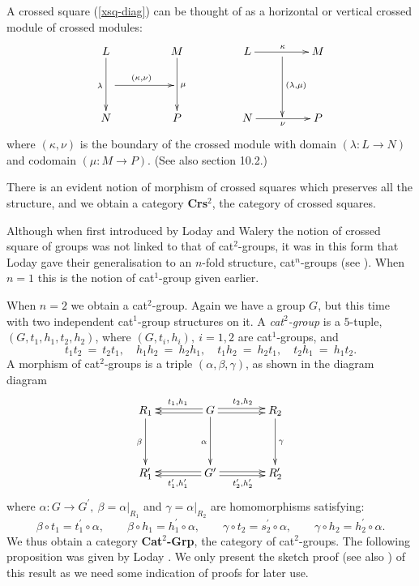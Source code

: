 \documentclass[a4paper,11pt]{article}
\theoremstyle{plain}
\theoremstyle{definition}
\begin{document}
A crossed square (\ref{xsq-diag}) can be thought of as a horizontal or vertical 
crossed module of crossed modules:
\[
\xymatrix@R=20pt@C=20pt
{ L \ar[dd]_{\lambda}  
	&  &  M \ar[dd]^{\mu} 
	      &  &  L \ar[rr]^{\kappa}
	            &  {} \ar[dd]^{(\lambda,\mu)} 
	               &  M \\ 
\quad \ar[rr]^{(\kappa,\nu)} 
    &  &  &  &  &  & \quad \\
  N &  &  P 
	      &  &  N \ar[rr]_{\nu} 
	            &  {} 
	               &  P 
} 
\]
\noindent 
where $(\kappa,\nu)$ is the boundary of the crossed module with 
domain $(\lambda : L \rightarrow N)$ and codomain $(\mu : M \rightarrow P)$. 
(See also \cite{wensley_notes} section 10.2.)

There is an evident notion of morphism of crossed squares  
which preserves all the structure, 
and we obtain a category \textbf{Crs}$^{2}$, the category of crossed squares.

Although when first introduced by Loday and Walery \cite{walery} 
the notion of crossed square of groups was not linked to that of cat$^{2}$-groups, 
it was in this form that Loday gave their generalisation 
to an $n$-fold structure, cat$^{n}$-groups (see \cite{Loday}). 
When $n=1$ this is the notion of cat$^1$-group given earlier.

When $n=2$ we obtain a cat$^{2}$-group. 
Again we have a group $G$, but this time with two independent cat$^{1}$-group 
structures on it. 
A \emph{cat$^{2}$-group} is a $5$-tuple, $(G,t_1,h_1,t_2,h_2)$, 
where $(G,t_{i},h_{i}),~ i=1,2$ are cat$^{1}$-groups, and
\[
t_{1}t_{2} ~=~ t_{2}t_{1}, \quad 
h_{1}h_{2} ~=~ h_{2}h_{1}, \quad 
t_{1}h_{2} ~=~ h_{2}t_{1}, \quad
t_{2}h_{1} ~=~ h_{1}t_{2}. 
\]
A morphism of cat$^{2}$-groups is a triple $(\alpha ,\beta ,\gamma)$,
as shown in the diagram diagram
\[
\xymatrix@R=40pt@C=40pt 
{ R_1 \ar[d]_{\beta} 
	& G \ar[d]_{\alpha} \ar@<-0.4ex>[l]_{t_1,h_1} \ar@<+0.4ex>[l]  
	                    \ar@<+0.5ex>[r]^{t_2,h_2} \ar@<-0.4ex>[r] 
		& R_2 \ar[d]^{\gamma} \\
  R'_1 
	& G' \ar@<+0.4ex>[l]^{t'_1,h'_1} \ar@<-0.4ex>[l] 
	     \ar@<-0.4ex>[r]_{t'_2,h'_2} \ar@<+0.4ex>[r] 
		& R'_2 
}
\]
\noindent where 
$\alpha : G \to G^{\prime},~ \beta = \alpha|_{R_1}$ 
and $\gamma = \alpha|_{R_2}$ are homomorphisms satisfying: 
$$	
\beta \circ t_1 = t_1^{\prime} \circ \alpha, \qquad 
\beta \circ h_1 = h_1^{\prime} \circ \alpha, \qquad 
\gamma \circ t_2 = s_2^{\prime} \circ \alpha, \qquad 
\gamma \circ h_2 = h_2^{\prime} \circ \alpha. 
$$
We thus obtain a category \textbf{Cat}$^{2}$\textbf{-Grp}, 
the category of cat$^{2}$-groups. 
The following proposition was given by Loday \cite{Loday}. 
We only present the sketch proof (see also \cite{mutpor}) of this result 
as we need some indication of proofs for later use.
\end{document}
